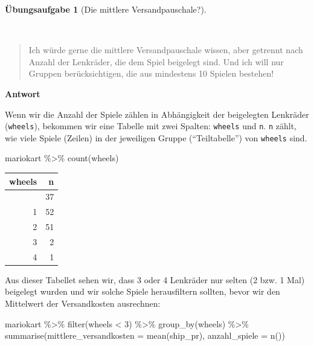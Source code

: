 \documentclass[
  letterpaper,
]{scrbook}
\newenvironment{Shaded}{\begin{snugshade}}{\end{snugshade}}
\newcommand{\AttributeTok}[1]{\textcolor[rgb]{0.40,0.45,0.13}{#1}}
\newcommand{\DecValTok}[1]{\textcolor[rgb]{0.68,0.00,0.00}{#1}}
\newcommand{\FunctionTok}[1]{\textcolor[rgb]{0.28,0.35,0.67}{#1}}
\newcommand{\NormalTok}[1]{\textcolor[rgb]{0.00,0.23,0.31}{#1}}
\newcommand{\SpecialCharTok}[1]{\textcolor[rgb]{0.37,0.37,0.37}{#1}}
\theoremstyle{definition}
\newtheorem{exercise}{Übungsaufgabe}[chapter]
\theoremstyle{definition}
\theoremstyle{definition}
\theoremstyle{remark}
\begin{document}
\begin{exercise}[Die mittlere
Versandpauschale?]\protect\hypertarget{exr-Forschungsfrage2}{}\label{exr-Forschungsfrage2}

~

\begin{quote}
{} Ich würde gerne die mittlere Versandpauschale wissen,
aber getrennt nach Anzahl der Lenkräder, die dem Spiel beigelegt sind.
Und ich will nur Gruppen berücksichtigen, die aus mindestens 10 Spielen
bestehen!
\end{quote}

\textbf{Antwort}

Wenn wir die Anzahl der Spiele zählen in Abhängigkeit der beigelegten
Lenkräder (\texttt{wheels}), bekommen wir eine Tabelle mit zwei Spalten:
\texttt{wheels} und \texttt{n}. \texttt{n} zählt, wie viele Spiele
(Zeilen) in der jeweiligen Gruppe (\enquote{Teiltabelle}) von
\texttt{wheels} sind.

\begin{Shaded}
\begin{Highlighting}[]
\NormalTok{mariokart }\SpecialCharTok{\%\textgreater{}\%}
  \FunctionTok{count}\NormalTok{(wheels)}
\end{Highlighting}
\end{Shaded}

\begin{longtable}[]{@{}rr@{}}
\toprule\noalign{}
wheels & n \\
\midrule\noalign{}
\endhead
\bottomrule\noalign{}
\endlastfoot
0 & 37 \\
1 & 52 \\
2 & 51 \\
3 & 2 \\
4 & 1 \\
\end{longtable}

Aus dieser Tabellet sehen wir, dass 3 oder 4 Lenkräder nur selten (2
bzw. 1 Mal) beigelegt wurden und wir solche Spiele herausfiltern
sollten, bevor wir den Mittelwert der Versandkosten ausrechnen:

\begin{Shaded}
\begin{Highlighting}[]
\NormalTok{mariokart }\SpecialCharTok{\%\textgreater{}\%}
  \FunctionTok{filter}\NormalTok{(wheels }\SpecialCharTok{\textless{}} \DecValTok{3}\NormalTok{) }\SpecialCharTok{\%\textgreater{}\%} 
  \FunctionTok{group\_by}\NormalTok{(wheels) }\SpecialCharTok{\%\textgreater{}\%} 
  \FunctionTok{summarise}\NormalTok{(}\AttributeTok{mittlere\_versandkosten =} \FunctionTok{mean}\NormalTok{(ship\_pr),}
            \AttributeTok{anzahl\_spiele =} \FunctionTok{n}\NormalTok{())}
\end{Highlighting}
\end{Shaded}


\end{exercise}
\end{document}
